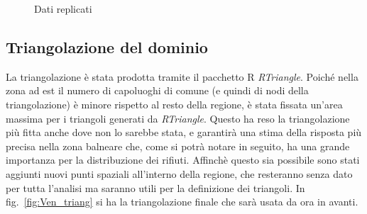 \documentclass[a4paper,11pt,twoside,openright]{book}							%
\begin{document}
\begin{figure}[t]
\centering
{}
\caption{Dati replicati}
\label{fig:Ven_rep}
\end{figure}


\subsection{Triangolazione del dominio}

La triangolazione è stata prodotta tramite il pacchetto R \textit{RTriangle}. Poiché nella zona ad est il numero di capoluoghi di comune (e quindi di nodi della triangolazione) è minore rispetto al resto della regione, è stata fissata un'area massima per i triangoli generati da \textit{RTriangle}. Questo ha reso la triangolazione più fitta anche dove non lo sarebbe stata, e garantirà una stima della risposta più precisa nella zona balneare che, come si potrà notare in seguito, ha una grande importanza per la distribuzione dei rifiuti. Affinchè questo sia possibile sono stati aggiunti nuovi punti spaziali all'interno della regione, che resteranno senza dato per tutta l'analisi ma saranno utili per la definizione dei triangoli. In fig.~\ref{fig:Ven_triang} si ha la triangolazione finale che sarà usata da ora in avanti.
\end{document}
